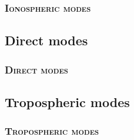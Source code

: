 \documentclass[aspectratio=169, 10pt, utf8, mathserif]{beamer}
\numberwithin{equation}{section} %
\numberwithin{figure}{section} %
\begin{document}
\begin{frame}
\frametitle{\textsc{Ionospheric modes}}


\end{frame}

\subsection[Direct modes (line-of-sight) 视距传播]{Direct modes}\label{subsec:6-4}

\begin{frame}
\frametitle{\textsc{Direct modes}}


\end{frame}


\subsection[Tropospheric modes 对流层散射传播]{Tropospheric modes}\label{subsec:6-5}

\begin{frame}
\frametitle{\textsc{Tropospheric modes}}


\end{frame}


\begin{frame}
\end{frame}
\end{document}
